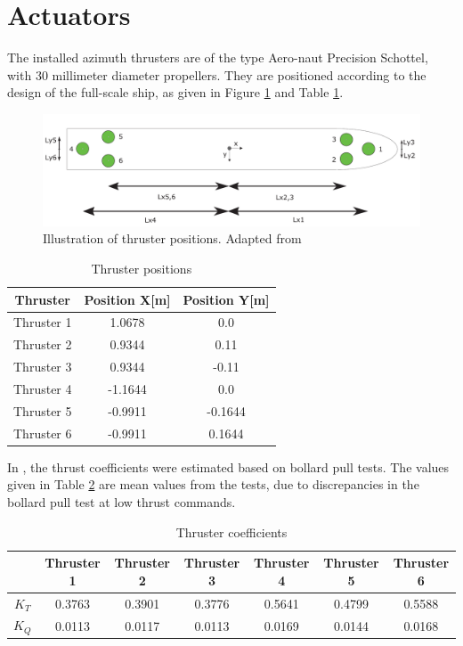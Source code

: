 \section{Actuators}
The installed azimuth thrusters are of the type Aero-naut Precision Schottel, with 30 millimeter diameter propellers. They are positioned according to the design of the full-scale ship, as given in Figure \ref{fig:thruster_positions} and Table \ref{tab:thruster_positions}. 
\begin{figure}[htb!]
	\centering
	\includegraphics[width=\linewidth]{fig/thruster_position.png}
	\caption{Illustration of thruster positions. Adapted from \cite{frederich2016constrained}}
	\label{fig:thruster_positions}
\end{figure}
\begin{table}[htb!]
	\centering
	\caption{Thruster positions}
	\label{tab:thruster_positions}
	\begin{tabular}{ccc}
		\hline
		\textbf{Thruster} & \textbf{Position X}[m] & \textbf{Position Y}[m]\\ \hline
		Thruster 1 & 1.0678 & 0.0\\
		Thruster 2 & 0.9344 & 0.11\\
		Thruster 3 & 0.9344 & -0.11\\
		Thruster 4 & -1.1644 & 0.0\\
		Thruster 5 & -0.9911 & -0.1644\\
		Thruster 6 & -0.9911 & 0.1644\\ \hline
	\end{tabular}
\end{table}

In \cite{frederich2016constrained}, the thrust coefficients were estimated based on bollard pull tests. The values given in Table \ref{tab:thruster_coefficients} are mean values from the tests, due to discrepancies in the bollard pull test at low thrust commands. 
\begin{table}[htb!]
	\centering
	\caption{Thruster coefficients}
	\label{tab:thruster_coefficients}
	\begin{tabular}{ccccccc}
		\hline
		 & \textbf{Thruster 1} & \textbf{Thruster 2} & \textbf{Thruster 3} & \textbf{Thruster 4} & \textbf{Thruster 5} & \textbf{Thruster 6}\\ \hline
		$K_T$ & 0.3763 & 0.3901 & 0.3776 & 0.5641 & 0.4799 & 0.5588\\
		$K_Q$ & 0.0113 & 0.0117 & 0.0113 & 0.0169 & 0.0144 & 0.0168\\ \hline
	\end{tabular}
\end{table}

